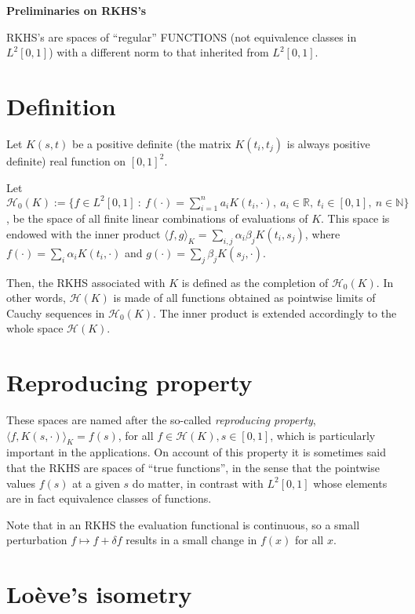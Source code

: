 \documentclass[11pt]{article}
\def\calh{{\mathcal{H}}}
\begin{document}
\begin{center}
\large \bf  Preliminaries on RKHS's\rm
\end{center}

RKHS's are spaces of ``regular'' FUNCTIONS (not equivalence classes in $L^2[0,1]$) with a different norm to that inherited from $L^2[0,1]$.

\section*{Definition}

	Let $K(s,t)$ be a positive definite (the matrix $K(t_i,t_j)$ is always positive definite) real function on $[0,1]^2$.

	Let $\calh_0(K):=\{f\in L^2[0,1] \ : \ f(\cdot)=\sum_{i=1}^n a_i K(t_i,\cdot),\ a_i\in{\mathbb R},\ t_i\in[0,1],\ n\in{\mathbb N}\}$, be
	the space of all finite linear combinations of evaluations of $K$.  This space is endowed with the inner product
	$\langle f,g\rangle_K=\sum_{i,j}\alpha_i\beta_j K(t_i,s_j)$,
	where $f(\cdot)=\sum_i\alpha_i K(t_i,\cdot)$ and $g(\cdot)=\sum_j\beta_j K(s_j,\cdot)$.

	Then, the RKHS associated with $K$ is defined as the completion of $\calh_0(K)$. In other words, $\calh(K)$ is made of all functions obtained as pointwise limits of Cauchy sequences in $\calh_0(K)$. The inner product is extended accordingly to the whole space $\calh(K)$.

\section*{Reproducing property}

	These spaces are named after the so-called \textit{reproducing property},
	$\langle f, K(s,\cdot)\rangle_K = f(s)$, for all  $f\in\calh(K), s\in[0,1]$, which is particularly important in the applications. On account of this property it is sometimes said that the RKHS are spaces of ``true functions'', in the sense that the pointwise values $f(s)$ at a given $s$ do matter, in contrast with $L^2[0,1]$ whose elements are in fact equivalence classes of functions.

  Note that in an RKHS the evaluation functional is continuous, so a small perturbation $f\mapsto f + \delta f$ results in a small change in $f(x)$ for all $x$.


\section*{Loève's isometry}
\end{document}

